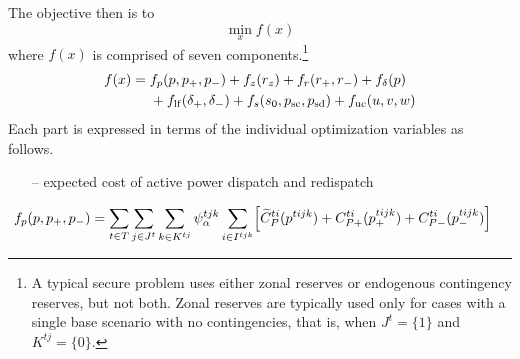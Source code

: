 \documentclass[12pt]{article}
\numberwithin{equation}{section}
\numberwithin{table}{section}
\numberwithin{figure}{section}
\begin{document}
The objective then is to
\begin{equation}
\min_x f(x)
\label{eq:objfcn1}
\end{equation}
where $f(x)$ is comprised of seven components.\footnote{A typical secure problem uses either zonal reserves or endogenous contingency reserves, but not both. Zonal reserves are typically used only for cases with a single base scenario with no contingencies, that is, when $J^t = \{1\}$ and $K^{tj} = \{0\}$.}
\begin{align}
f(x) = \;& f_p(p,p_+,p_-) + f_z(r_z) + f_r(r_+, r_-) + f_\delta(p) \nonumber \\
    &{} + f_{\rm lf}(\delta_+, \delta_-)
     + f_s(s_0, p_{\rm sc}, p_{\rm sd}) + f_{\rm uc}(u,v,w) \label{eq:mostobjective}
\end{align}
Each part is expressed in terms of the individual optimization variables as follows.
\begin{itemize}
\item[--] expected cost of active power dispatch and redispatch
\end{itemize}
\begin{align}
f_p(p,p_+,p_-) &= \sum_{t\in T} \sum_{j\in J^t} \sum_{k\in K^{tj}} \psi_\alpha^{tjk} \sum_{i\in I^{tjk}}
    \Bigl[\widetilde{C}_P^{ti}(p^{tijk}) + C_{P+}^{ti}(p_+^{tijk}) + C_{P-}^{ti}(p_-^{tijk}) \Bigr]
\label{eq:most_energy_cost}
\end{align}
\end{document}
